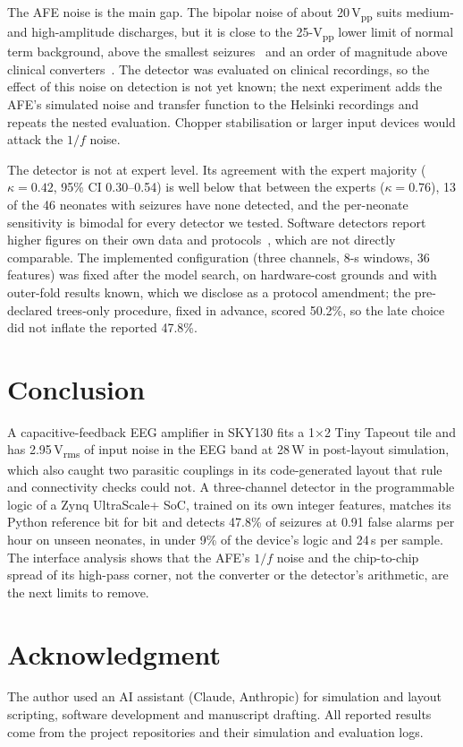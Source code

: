 \documentclass[conference]{IEEEtran}
\newcommand{\uVrms}{\,\textmu V\textsubscript{rms}}
\newcommand{\uVpp}{\,\textmu V\textsubscript{pp}}
\newcommand{\uW}{\,\textmu W}
\begin{document}
The AFE noise is the main gap. The bipolar noise of about 20\uVpp{} suits medium- and high-amplitude discharges, but it is close to the 25-\textmu V\textsubscript{pp} lower limit of normal term background, above the smallest seizures~\cite{tsuchida2013} and an order of magnitude above clinical converters~\cite{ads1299}. The detector was evaluated on clinical recordings, so the effect of this noise on detection is not yet known; the next experiment adds the AFE's simulated noise and transfer function to the Helsinki recordings and repeats the nested evaluation. Chopper stabilisation or larger input devices would attack the $1/f$ noise.

The detector is not at expert level. Its agreement with the expert majority ($\kappa = 0.42$, 95\% CI 0.30--0.54) is well below that between the experts ($\kappa = 0.76$), 13 of the 46 neonates with seizures have none detected, and the per-neonate sensitivity is bimodal for every detector we tested. Software detectors report higher figures on their own data and protocols~\cite{temko2011,ansari2019,oshea2020}, which are not directly comparable. The implemented configuration (three channels, 8-s windows, 36 features) was fixed after the model search, on hardware-cost grounds and with outer-fold results known, which we disclose as a protocol amendment; the pre-declared trees-only procedure, fixed in advance, scored 50.2\%, so the late choice did not inflate the reported 47.8\%.

\section{Conclusion}

A capacitive-feedback EEG amplifier in SKY130 fits a 1$\times$2 Tiny Tapeout tile and has 2.95\uVrms{} of input noise in the EEG band at 28\uW{} in post-layout simulation, which also caught two parasitic couplings in its code-generated layout that rule and connectivity checks could not. A three-channel detector in the programmable logic of a Zynq UltraScale+ SoC, trained on its own integer features, matches its Python reference bit for bit and detects 47.8\% of seizures at 0.91 false alarms per hour on unseen neonates, in under 9\% of the device's logic and 24\,\textmu s per sample. The interface analysis shows that the AFE's $1/f$ noise and the chip-to-chip spread of its high-pass corner, not the converter or the detector's arithmetic, are the next limits to remove.

\section*{Acknowledgment}

The author used an AI assistant (Claude, Anthropic) for simulation and layout scripting, software development and manuscript drafting. All reported results come from the project repositories and their simulation and evaluation logs.



\end{document}
